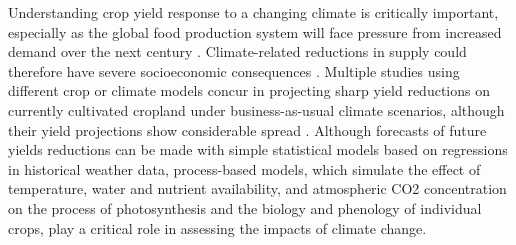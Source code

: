 \documentclass[gmd, manuscript]{copernicus} %
\begin{document}
\introduction
\label{S:1}
Understanding crop yield response to a changing climate is critically important, especially as the global food production system will face pressure from increased demand over the next century \citep{Foley2005,bodirsky2015}. 
Climate-related reductions in supply could therefore have severe socioeconomic consequences \citep[e.g.][]{Stevanovic2016,Wiebe_2015}. 
Multiple studies using different crop or climate models concur in projecting sharp yield reductions on currently cultivated cropland under {business-as-usual} climate scenarios, although their yield projections show considerable spread \citep[e.g.][and references therein]{Rosenzweig2014, Schauberger2017, porter2014}. 
Although forecasts of future yields reductions can be made with simple statistical models based on regressions in historical weather data, process-based models, which simulate the effect of temperature, water and nutrient availability, and atmospheric CO2 concentration on the process of photosynthesis and the biology and phenology of individual crops, play a critical role in assessing the impacts of climate change.
\end{document}
